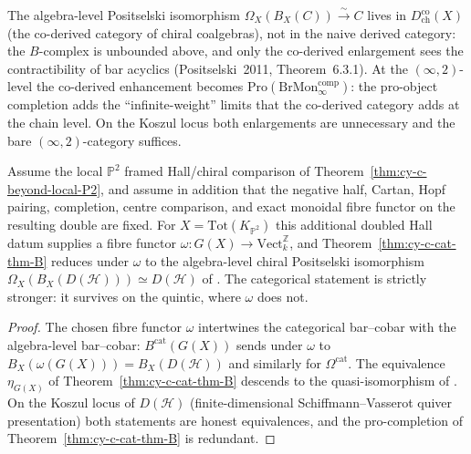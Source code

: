 \begin{remark}
\label{rem:cy-c-cat-thm-B-coderived}
The algebra-level Positselski isomorphism
$\Omega_X(B_X(C)) \xrightarrow{\sim} C$ lives in
$D^{\mathrm{co}}_{\mathrm{ch}}(X)$ (the co-derived category of chiral
coalgebras), not in the naive derived category: the $B$-complex is
unbounded above, and only the co-derived enlargement sees the
contractibility of bar acyclics (Positselski~2011, Theorem~6.3.1). At
the $(\infty,2)$-level the co-derived enhancement becomes
$\mathrm{Pro}(\mathrm{BrMon}^{\mathrm{comp}}_\infty)$: the pro-object
completion adds the ``infinite-weight'' limits that the co-derived
category adds at the chain level. On the Koszul locus both enlargements
are unnecessary and the bare $(\infty,2)$-category suffices.
\end{remark}

\begin{corollary}
\label{cor:cy-c-cat-thm-B-local-P2}
Assume the local $\mathbb P^2$ framed Hall/chiral comparison of
Theorem~\ref{thm:cy-c-beyond-local-P2}, and assume in addition that the
negative half, Cartan, Hopf pairing, completion, centre comparison, and
exact monoidal fibre functor on the resulting double are fixed.
For $X = \mathrm{Tot}(K_{\mathbb P^2})$ this additional doubled Hall
datum supplies a fibre functor
\(\omega : G(X) \to \mathrm{Vect}_k^{\mathbb Z}\), and
Theorem~\ref{thm:cy-c-cat-thm-B} reduces under $\omega$ to the
algebra-level chiral Positselski isomorphism
$\Omega_X(B_X(D(\mathcal H))) \simeq D(\mathcal H)$ of
\cite{VolI}. The categorical statement is
strictly stronger: it survives on the quintic, where $\omega$ does not.
\end{corollary}

\begin{proof}
The chosen fibre functor $\omega$ intertwines the categorical bar--cobar with
the algebra-level bar--cobar: $B^{\mathrm{cat}}(G(X))$
sends under $\omega$ to $B_X(\omega(G(X))) = B_X(D(\mathcal H))$ and
similarly for $\Omega^{\mathrm{cat}}$. The equivalence
$\eta_{G(X)}$ of Theorem~\ref{thm:cy-c-cat-thm-B} descends to the
quasi-isomorphism of \cite{VolI}. On the
Koszul locus of $D(\mathcal H)$ (finite-dimensional Schiffmann--Vasserot
quiver presentation) both statements are honest equivalences, and the
pro-completion of Theorem~\ref{thm:cy-c-cat-thm-B} is redundant.
\end{proof}

